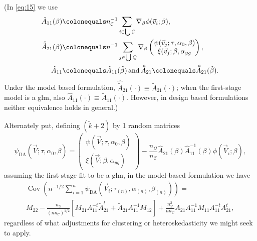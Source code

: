 \documentclass{article}
\newcommand{\defeq}{\ensuremath{\colonequals}}
\begin{document}
(In \eqref{eq:15}
we use
\begin{align*}
  \hat{A}_{11}(\beta) &\defeq  n_{\mathcal{C}}^{-1}\sum_{i\in \bigcup
        \mathcal{C}}\nabla_{\beta}\phi(\vec{v}_{i};
        \beta ),\\
  \hat{\tilde{A}}_{21}(\beta) &\defeq n^{-1}\sum_{j\in \bigcup
        \mathcal{Q}}\nabla_{\beta}\begin{pmatrix}\psi(\vec{v}_{j};
        \tau, \alpha_{0}, \beta )\\ \xi(\vec{v}_{j};\beta, \alpha_{yg}\\ \end{pmatrix},\\
  \hat{A}_{11}&\defeq \hat{A}_{11}(\hat\beta)\, \text{and}\, \hat{\tilde{A}}_{21}\defeq \hat{\tilde{A}}_{21}(\hat\beta).
\end{align*}
Under the model based
formulation, $\hat{\tilde{A}}_{21}(\cdot) \equiv \tilde{A}_{21}(\cdot)$; when the
first-stage model is a glm, also $\hat{A}_{11}(\cdot) \equiv
\tilde{A}_{11}(\cdot)$.  However, in design based formulations neither
equivalence holds in general.)

Alternately put,
defining $(\tilde{k}+2)$ by 1 random matrices
\begin{equation}\label{eq:10}
    \psi_\text{DA}(\vec{V}; \tau, \alpha_{0},
    \beta) = \begin{pmatrix}\psi (\vec{V}; \tau,\alpha_{0},
    \beta) \\ \xi(\vec{V};\beta, \alpha_{yg}) \end{pmatrix} -
    \frac{n_{\mathcal{Q}}}{n_{\mathcal{C}}}
    \hat{{A}}_{21}(\beta) \hat{A}_{11}^{-1}(\beta)\phi(\vec{V}_{i};
    \beta),
\end{equation}
assuming the first-stage fit to be a glm, in the model-based formulation we have
\begin{multline}
  \operatorname{Cov}\left(n^{-1/2}\sum_{i=1}^{n} \psi_\text{DA}(\vec{V}_{i}; \tau_{(n)},\alpha_{(n)},
    \beta_{(n)})\right) = \\
  M_{22} -
                                 \frac{n_{\mathcal{Q}}}{(n n_{\mathcal{C}})^{1/2}}[M_{21}A_{11}^{-t}\tilde{A}_{21}^t
                                 + \tilde{A}_{21}A_{11}^{-1}M_{12}] +
                                 \frac{n_{\mathcal{Q}}^{2}}{nn_C}{A}_{21}A_{11}^{-1}M_{11}A_{11}^{-t}{A}_{21}^{t}, \label{eq:12}
                               \end{multline}
regardless of what adjustments for
clustering or heteroskedasticity we might seek to apply.
\end{document}
